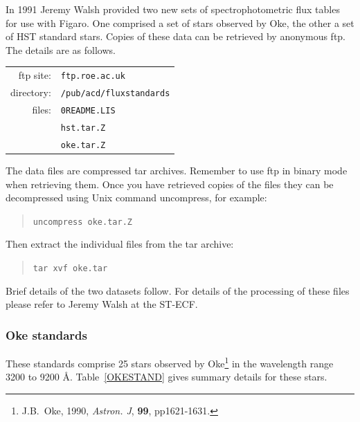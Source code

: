    In 1991 Jeremy Walsh provided two new sets of spectrophotometric flux
   tables for use with Figaro.  One comprised a set of stars observed by
   Oke, the other a set of HST standard stars.  Copies of these data can
   be retrieved by anonymous ftp.  The details are as follows.

\begin{center}
\begin{tabular}{rl}
ftp site:  & {\tt ftp.roe.ac.uk} \\
directory: & {\tt  /pub/acd/fluxstandards} \\
files:     & {\tt  0README.LIS}  \\
           & {\tt  hst.tar.Z}    \\
           & {\tt  oke.tar.Z}    \\
\end{tabular}
\end{center}

   The data files are compressed tar archives.  Remember to use ftp in
   binary mode when retrieving them.  Once you have retrieved copies of
   the files they can be decompressed using Unix command uncompress, for
   example:

\begin{quote}
{\tt uncompress oke.tar.Z}
\end{quote}

   Then extract the individual files from the tar archive:

\begin{quote}
{\tt tar xvf oke.tar}
\end{quote}

   Brief details of the two datasets follow.  For details of the processing
   of these files please refer to Jeremy Walsh at the ST-ECF.

\subsubsection{Oke standards}

   These standards comprise 25 stars observed by Oke\footnote{J.B.~Oke,
   1990, {\it Astron. J}, {\bf 99}, pp1621-1631.} in the wavelength range
   3200 to 9200 \AA .  Table~\ref{OKESTAND} gives summary details for these
   stars.

